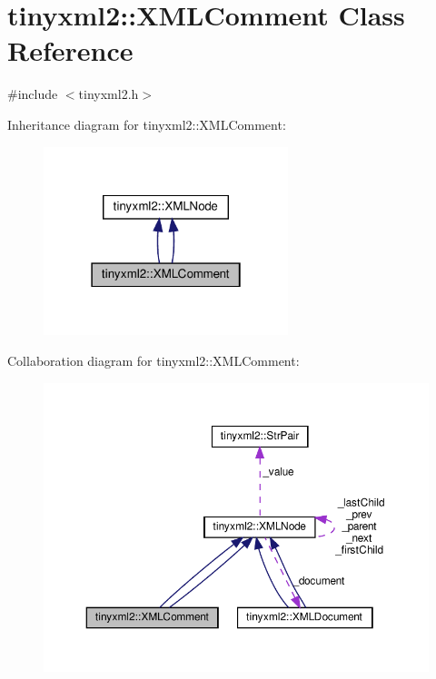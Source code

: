 \hypertarget{classtinyxml2_1_1XMLComment}{}\section{tinyxml2\+:\+:X\+M\+L\+Comment Class Reference}
\label{classtinyxml2_1_1XMLComment}


{\ttfamily \#include $<$tinyxml2.\+h$>$}



Inheritance diagram for tinyxml2\+:\+:X\+M\+L\+Comment\+:
\nopagebreak
\begin{figure}[H]
\begin{center}
\leavevmode
\includegraphics[width=202pt]{classtinyxml2_1_1XMLComment__inherit__graph}
\end{center}
\end{figure}


Collaboration diagram for tinyxml2\+:\+:X\+M\+L\+Comment\+:
\nopagebreak
\begin{figure}[H]
\begin{center}
\leavevmode
\includegraphics[width=350pt]{classtinyxml2_1_1XMLComment__coll__graph}
\end{center}
\end{figure}
